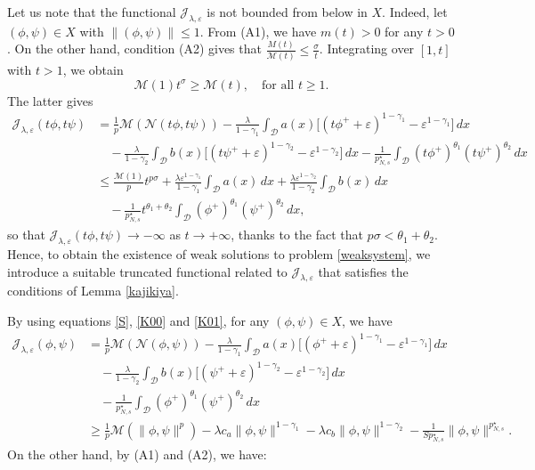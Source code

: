 \documentclass[reqno]{amsart}
\begin{document}
Let us note that the functional $\mathcal{J}_{\lambda,\varepsilon}$ is not bounded 
from below in $X$. Indeed, let $(\phi,\psi)\in X$ with $\|(\phi,\psi)\|\leq 1$. 
From (A1), we have $m(t)>0$ for any $t>0$. On the other hand, condition (A2) gives 
that $\frac{M(t)}{\mathscr{M}(t)}\leq\frac{\sigma}{t}$. 
Integrating over $[1,t]$ with $t>1$, we obtain
\[
\mathscr{M}(1)t^\sigma\geq \mathscr{M}(t), \quad \text{for all } t\geq 1.
\]
The latter gives
\begin{align*}
\mathcal{J}_{\lambda,\varepsilon}(t\phi,t\psi)&=\frac{1}{p}\mathscr{M}(\mathcal{N}(t\phi,t\psi))-\frac{\lambda}{1-\gamma_1}\int_\mathcal{D} a(x)\Big[(t\phi^++\varepsilon)^{1-\gamma_1}-\varepsilon^{1-\gamma_1}\Big]\,dx\\
&\quad -\frac{\lambda}{1-\gamma_2}\int_\mathcal{D} b(x)\Big[(t\psi^+
 +\varepsilon)^{1-\gamma_2}-\varepsilon^{1-\gamma_2}\Big]\,dx
 -\frac{1}{p^\star_{N,s}}\int_\mathcal{D}  (t\phi^+)^{\theta_1}(t\psi^+)^{\theta_2}\,dx\\
&\leq \frac{\mathscr{M}(1)}{p}t^{p\sigma}
 +\frac{\lambda\varepsilon^{1-\gamma_1}}{1-\gamma_1}\int_\mathcal{D}a(x)\,dx
 +\frac{\lambda\varepsilon^{1-\gamma_2}}{1-\gamma_2} \int_\mathcal{D}b(x)\,dx\\
&\quad -\frac{1}{p^\star_{N,s}}t^{\theta_1+\theta_2}
 \int_\mathcal{D}  (\phi^+)^{\theta_1}(\psi^+)^{\theta_2}\,dx,
\end{align*}
so that $\mathcal{J}_{\lambda,\varepsilon}(t\phi,t\psi)\to -\infty$ as $t\to +\infty$, 
thanks to the fact that $p\sigma<\theta_1+\theta_2$. Hence, to obtain the existence 
of weak solutions to problem \eqref{weaksystem}, we introduce a suitable truncated 
functional related to $\mathcal{J}_{\lambda,\varepsilon}$ that satisfies the 
conditions of Lemma \ref{kajikiya}.

By using equations \eqref{S}, \eqref{K00} and \eqref{K01}, for any 
$(\phi,\psi)\in X$, we have
\begin{align*}
\mathcal{J}_{\lambda,\varepsilon}(\phi,\psi)
&= \frac{1}{p}\mathscr{M}(\mathcal{N}(\phi,\psi))
 -\frac{\lambda}{1-\gamma_1}\int_\mathcal{D} a(x)\Big[(\phi^+
 +\varepsilon)^{1-\gamma_1}-\varepsilon^{1-\gamma_1}\Big]\,dx\\
&\quad - \frac{\lambda}{1-\gamma_2}\int_\mathcal{D} b(x)
 \Big[(\psi^++\varepsilon)^{1-\gamma_2}-\varepsilon^{1-\gamma_2}\Big]\,dx\\
&\quad - \frac{1}{p^\star_{N,s}}\int_\mathcal{D}  (\phi^+)^{\theta_1}
 (\psi^+)^{\theta_2}\,dx\\
&\geq \frac{1}{p}\mathscr{M}(\|\phi,\psi\|^p)
 - \lambda c_a\| \phi,\psi\|^{1-\gamma_1}-\lambda c_b\| \phi,\psi\|^{1-\gamma_2}
 -\frac{1}{Sp^\star_{N,s}}\| \phi,\psi\|^{p^\star_{N,s}}.
\end{align*}
On the other hand, by (A1) and (A2), we have:
\end{document}
